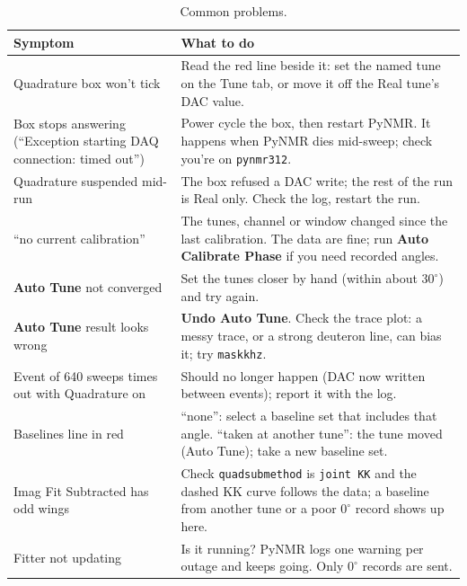\documentclass[11pt]{article}
\newcommand{\code}[1]{\texttt{\begingroup\def\_{\textunderscore\allowbreak}#1\endgroup}}
\newcommand{\btn}[1]{\textsf{\textbf{#1}}}   %
\begin{document}
\begin{table}[ht]
\centering\small
\begin{tabularx}{\textwidth}{@{}>{\raggedright\arraybackslash}p{}X@{}}
\toprule
Symptom & What to do \\
\midrule
Quadrature box won't tick & Read the red line beside it: set the named tune on the Tune tab, or move it off the Real tune's DAC value. \\
Box stops answering (``Exception starting DAQ connection: timed out'') & Power cycle the box, then restart PyNMR. It happens when PyNMR dies mid-sweep; check you're on \code{pynmr312}. \\
Quadrature suspended mid-run & The box refused a DAC write; the rest of the run is Real only. Check the log, restart the run. \\
``no current calibration'' & The tunes, channel or window changed since the last calibration. The data are fine; run \btn{Auto Calibrate Phase} if you need recorded angles. \\
\btn{Auto Tune} not converged & Set the tunes closer by hand (within about $30^\circ$) and try again. \\
\btn{Auto Tune} result looks wrong & \btn{Undo Auto Tune}. Check the trace plot: a messy trace, or a strong deuteron line, can bias it; try \code{mask\_khz}. \\
Event of 640 sweeps times out with Quadrature on & Should no longer happen (DAC now written between events); report it with the log. \\
Baselines line in red & ``none'': select a baseline set that includes that angle. ``taken at another tune'': the
tune moved (Auto Tune); take a new baseline set. \\
Imag Fit Subtracted has odd wings & Check \code{quad\_sub\_method} is \code{joint KK} and the dashed KK curve follows the
data; a baseline from another tune or a poor $0^\circ$ record shows up here. \\
Fitter not updating & Is it running? PyNMR logs one warning per outage and keeps going. Only $0^\circ$ records are sent. \\
\bottomrule
\end{tabularx}
\caption{Common problems.}
\end{table}

\end{document}
